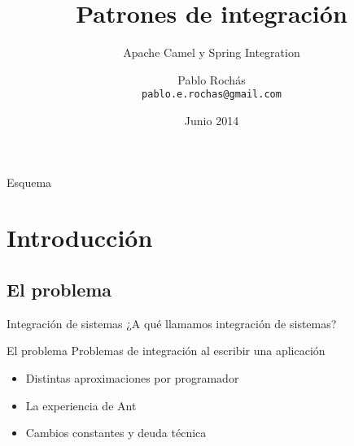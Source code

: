 \documentclass{beamer}
\title{Patrones de integración}
\subtitle{Apache Camel y Spring Integration}
\author[Despegar.com]{Pablo Rochás\\ \texttt{pablo.e.rochas@gmail.com}}
\date[Despegar]{Junio 2014}
\begin{document}
\begin{frame}
\titlepage
\end{frame}

\begin{frame}{Esquema}
  \tableofcontents
\end{frame}

\section{Introducción}
\subsection{El problema}
\begin{frame}{Integración de sistemas}
¿A qué llamamos integración de sistemas?
\end{frame}

\begin{frame}{El problema}
Problemas de integración al escribir una aplicación
\begin{itemize}
\item Distintas aproximaciones por programador
\item La experiencia de Ant
\item Cambios constantes y deuda técnica
\end{itemize}
\end{frame}


\end{document}
